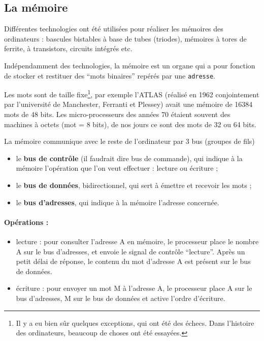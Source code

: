 \begin{multicols}{2}
\subsection{La mémoire}

Différentes technologies ont été utilisées pour réaliser
les mémoires des ordinateurs : bascules bistables à base 
de tubes (triodes),
mémoires à tores de ferrite, à transistors,  
circuits intégrés etc.

Indépendamment des technologies, la mémoire est un organe
qui a pour fonction de stocker et restituer des ``mots binaires''
repérés par une \texttt{adresse}.

Les mots sont de taille fixe\footnote{Il y a eu bien sûr quelques
  exceptions, qui ont été des échecs. Dans l'histoire des ordinateurs,
  beaucoup de choses ont été essayées.}, par exemple l'ATLAS (réalisé
en 1962 conjointement par l'université de Manchester, Ferranti et
Plessey) avait une mémoire de 16384 mots de 48 bits.  Les
micro-processeurs des années 70 étaient souvent des machines à octets
(mot = 8 bits), de nos jours ce sont des mots de 32 ou 64 bits.

La mémoire communique avec le reste de l'ordinateur par
3 bus (groupes de fils)
\begin{itemize}
\item le \textbf{bus de contrôle} (il faudrait dire bus de commande), 
qui indique à la mémoire l'opération 
que l'on veut effectuer : lecture ou écriture ;
\item le \textbf{bus de données}, bidirectionnel, qui sert à émettre et
recevoir les mots ;
\item le \textbf{bus d'adresses}, qui indique à la mémoire l'adresse
concernée.
\end{itemize}


\paragraph{Opérations :}
\begin{itemize}
\item lecture : pour consulter l'adresse A en  mémoire, 
le processeur
place le nombre A sur le bus d'adresses, et envoie le 
signal de contrôle ``lecture''. Après un petit délai de réponse, 
le contenu du mot d'adresse A est présent sur le bus de données.
\item écriture : pour envoyer un mot M à l'adresse A, le processeur
place A sur le bus d'adresses, M sur le bus de données et
active l'ordre d'écriture.
\end{itemize}


\end{multicols}

